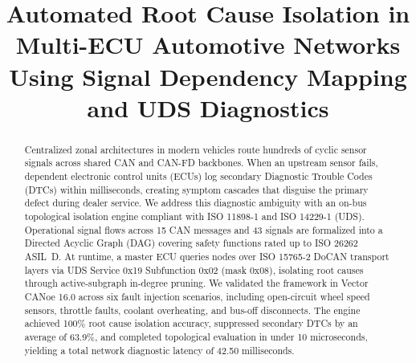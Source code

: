 \documentclass[conference]{IEEEtran}
\begin{document}
\title{Automated Root Cause Isolation in Multi-ECU Automotive Networks Using Signal Dependency Mapping and UDS Diagnostics}

\author{
\and
{}
}

\maketitle

\begin{abstract}
Centralized zonal architectures in modern vehicles route hundreds of cyclic sensor signals across shared CAN and CAN-FD backbones. When an upstream sensor fails, dependent electronic control units (ECUs) log secondary Diagnostic Trouble Codes (DTCs) within milliseconds, creating symptom cascades that disguise the primary defect during dealer service. We address this diagnostic ambiguity with an on-bus topological isolation engine compliant with ISO 11898-1 and ISO 14229-1 (UDS). Operational signal flows across 15 CAN messages and 43 signals are formalized into a Directed Acyclic Graph (DAG) covering safety functions rated up to ISO 26262 ASIL~D. At runtime, a master ECU queries nodes over ISO 15765-2 DoCAN transport layers via UDS Service 0x19 Subfunction 0x02 (mask 0x08), isolating root causes through active-subgraph in-degree pruning. We validated the framework in Vector CANoe 16.0 across six fault injection scenarios, including open-circuit wheel speed sensors, throttle faults, coolant overheating, and bus-off disconnects. The engine achieved 100\% root cause isolation accuracy, suppressed secondary DTCs by an average of 63.9\%, and completed topological evaluation in under 10 microseconds, yielding a total network diagnostic latency of 42.50 milliseconds.
\end{abstract}
\end{document}
